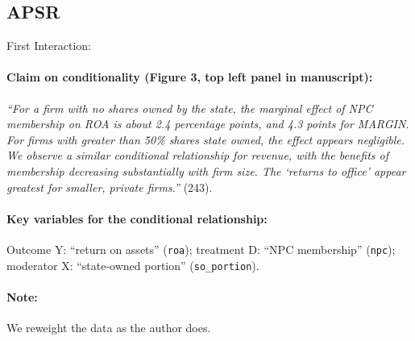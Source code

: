 \documentclass[12pt]{article}
\begin{document}
\clearpage


\subsection{\citet{Truex2014} APSR} \label{truex}

\noindent First Interaction:

\paragraph{Claim on conditionality (Figure 3, top left panel in manuscript):} \emph{``For a firm with no shares owned by the state, the marginal effect of NPC membership on ROA is about 2.4 percentage points, and 4.3 points for MARGIN. For firms with greater than 50\% shares state owned, the effect appears negligible. We observe a similar conditional relationship for revenue, with the benefits of membership decreasing substantially with firm size. The `returns to office' appear greatest for smaller, private firms.''} (243). 

\paragraph{Key variables for the conditional relationship:} Outcome Y:
``return on assets'' (\texttt{roa}); treatment D: ``NPC membership'' (\texttt{npc}); moderator X: ``state-owned portion''
(\texttt{so\_portion}).

\paragraph{Note:} We reweight the data as the author does. 

\newpage
\end{document}

